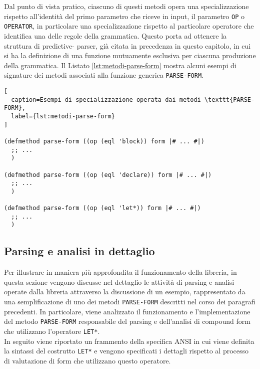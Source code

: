 Dal punto di vista pratico, ciascuno di questi metodi opera una specializzazione
rispetto all’identità del primo parametro che riceve in input, il parametro
\texttt{OP} o \texttt{OPERATOR}, in particolare una specializzazione rispetto al
particolare operatore che identifica una delle regole della grammatica. Questo
porta ad ottenere la struttura di predictive- parser, già citata in precedenza
in questo capitolo, in cui si ha la definizione di una funzione mutuamente
esclusiva per ciascuna produzione della grammatica. Il Listato
\ref{lst:metodi-parse-form} mostra alcuni esempi di signature dei metodi
associati alla funzione generica \texttt{PARSE-FORM}.

\begin{lstlisting}[
  caption=Esempi di specializzazione operata dai metodi \texttt{PARSE-FORM},
  label={lst:metodi-parse-form}
]

(defmethod parse-form ((op (eql 'block)) form |# ... #|)
  ;; ...
  )

(defmethod parse-form ((op (eql 'declare)) form |# ... #|)
  ;; ...
  )

(defmethod parse-form ((op (eql 'let*)) form |# ... #|)
  ;; ...
  )

\end{lstlisting}

\subsection{Parsing e analisi in dettaglio}

Per illustrare in maniera più approfondita il funzionamento della libreria, in
questa sezione vengono discusse nel dettaglio le attività di parsing e analisi
operate dalla libreria attraverso la discussione di un esempio, rappresentato da
una semplificazione di uno dei metodi \texttt {PARSE-FORM} descritti nel corso
dei paragrafi precedenti. In particolare, viene analizzato il funzionamento e
l'implementazione del metodo \texttt{PARSE-FORM} responsabile del parsing e
dell'analisi di compound form che utilizzano l’operatore \texttt{LET*}.\\

In seguito viene riportato un frammento della specifica ANSI in cui viene
definita la sintassi del costrutto \texttt{LET*} e vengono specificati i
dettagli rispetto al processo di valutazione di form che utilizzano questo
operatore.

